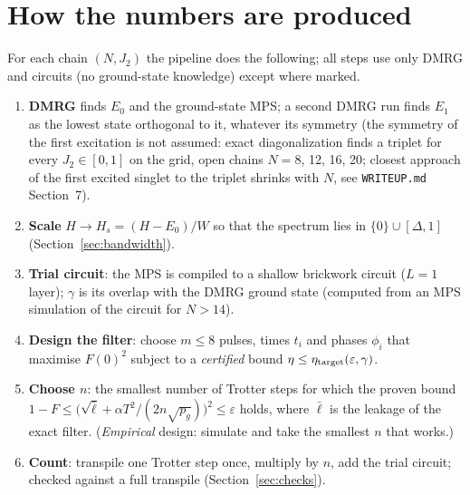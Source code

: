 \documentclass[11pt]{article}
\begin{document}
\section{How the numbers are produced}\label{sec:method}
For each chain $(N,J_2)$ the pipeline does the following; all steps use only DMRG and circuits (no ground-state knowledge) except where marked.
\begin{enumerate}
\item \textbf{DMRG} finds $E_0$ and the ground-state MPS; a second DMRG run finds $E_1$ as the lowest state orthogonal to it, whatever its symmetry (the symmetry of the first excitation is not assumed: exact diagonalization finds a triplet for every $J_2\in[0,1]$ on the grid, open chains $N=8$, 12, 16, 20; closest approach of the first excited singlet to the triplet shrinks with $N$, see \texttt{WRITEUP.md} Section~7).
\item \textbf{Scale} $H\to H_s=(H-E_0)/W$ so that the spectrum lies in $\{0\}\cup[\Delta,1]$ (Section~\ref{sec:bandwidth}).
\item \textbf{Trial circuit}: the MPS is compiled to a shallow brickwork circuit ($L=1$ layer); $\gamma$ is its overlap with the DMRG ground state (computed from an MPS simulation of the circuit for $N>14$).
\item \textbf{Design the filter}: choose $m\leq8$ pulses, times $t_i$ and phases $\phi_i$ that maximise $F(0)^2$ subject to a \emph{certified} bound $\eta\leq\eta_{\rm target}(\varepsilon,\gamma)$.
\item \textbf{Choose $n$}: the smallest number of Trotter steps for which the proven bound $1-F\leq\big(\sqrt{\bar\ell}+\alpha T^2/(2n\sqrt{p_g})\big)^2\leq\varepsilon$ holds, where $\bar\ell$ is the leakage of the exact filter. (\emph{Empirical} design: simulate and take the smallest $n$ that works.)
\item \textbf{Count}: transpile one Trotter step once, multiply by $n$, add the trial circuit; checked against a full transpile (Section~\ref{sec:checks}).
\end{enumerate}
\end{document}

